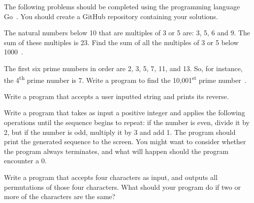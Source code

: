 

\noindent
The following problems should be completed using the programming language Go~\cite{gowebsite}.
You should create a GitHub repository containing your solutions.


\begin{questions}


\question
The natural numbers below 10 that are multiples of 3 or 5 are: 3, 5, 6 and 9.
The sum of these multiples is 23.
Find the sum of all the multiples of 3 or 5 below 1000~\cite{projecteuler}.
\begin{solution}
\end{solution}


\question
The first six prime numbers in order are 2, 3, 5, 7, 11, and 13.
So, for instance, the 4\textsuperscript{th} prime number is 7.
Write a program to find the 10,001\textsuperscript{st} prime number~\cite{projecteuler}.
\begin{solution}
\end{solution}


\question
Write a program that accepts a user inputted string and prints its reverse.
\begin{solution}
\end{solution}


\question
Write a program that takes as input a positive integer and applies the following operations until the sequence begins to repeat: if the number is even, divide it by 2, but if the number is odd, multiply it by 3 and add 1.
The program should print the generated sequence to the screen.
You might want to consider whether the program always terminates, and what will happen should the program encounter a 0. 
\begin{solution}
\end{solution}


\question
Write a program that accepts four characters as input, and outputs all permutations of those four characters.
What should your program do if two or more of the characters are the same?
\begin{solution}
\end{solution}


\end{questions}
